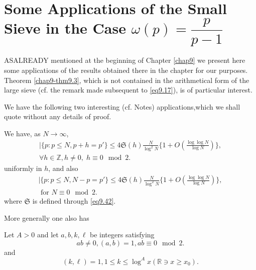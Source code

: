 
\chapter[Some Applications of the Small Sieve.....]{Some Applications
  of the Small Sieve in the Case $\omega(p) =
  \dfrac{p}{p-1}$}\label{chap10}%

AS\pageoriginale ALREADY mentioned at the beginning of Chapter \ref{chap9} we
present here 
some applications of the results obtained there in the chapter for
our purposes. Theorem \ref{chap9-thm9.3}, which is not contained in the
arithmetical form of the large sieve (cf. the remark made subsequent to
\eqref{eq9.17}), is of particular interest. 

We have the following two interesting (cf. Notes) applications,\break which
we shall quote without any details of proof. 

\setcounter{section}{10}
\setcounter{theorem}{0}
\begin{theorem}\label{chap10-thm10.1}
We have, as $N \to \infty$,
 \begin{gather*}
|\{p:p \leq N, p+h = p' \} \leq 4 \mathfrak{S} (h) \frac{N}{\log^2 N} \{ 1+O (
\frac{ \log \log N}{\log N}) \},\\
 \forall h \in \mathbb{Z}, h \neq 0, \; h
\equiv 0 \mod  2.\tag{10.1}\label{eq10.1} 
 \end{gather*} 
uniformly in $h$, and also 
\begin{gather*}
| \{p:p \leq N,N - p= p' \} \leq 4 \mathfrak{S} (h) \frac{N}{\log^2 N}
\{ 1+O ( \frac{ \log \log N}{\log N}) \},\\
\text{ for }  N \equiv 0 \mod
2.\tag{10.2}\label{eq10.2} 
\end{gather*}
 where $\mathfrak{S}$ is defined through \eqref{eq9.42}.
\end{theorem}

More generally one also has 

\begin{theorem}\label{chap10-thm10.2}
Let $A>0$ and let $a,b,k,\ell$ be integers satisfying 
\begin{equation*}
ab \neq 0, (a,b)= 1 , ab \equiv 0 \mod  2.\tag{10.3}\label{eq10.3}
\end{equation*}
and 
\begin{equation*}
(k,\ell)=1, 1 \leq k \leq \log^A x (\mathbb{R} \ni x \geq
  x_0).\tag{10.4}\label{eq10.4} 
\end{equation*}
\end{theorem}

